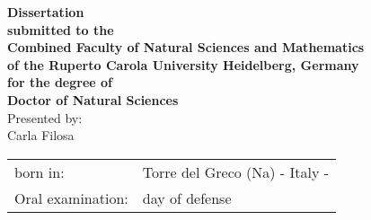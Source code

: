 \thispagestyle{plain}

\vspace*{1cm}

\begin{center}
\begin{large}
{\textbf{Dissertation\\submitted to the\\Combined Faculty of Natural Sciences and Mathematics\\of the Ruperto Carola University Heidelberg, Germany\\for the degree of\\Doctor of Natural Sciences}}\\
\vspace{10cm}
Presented by:\\ Carla Filosa\\
\vspace{1cm}
\begin{tabular}{ll}
born in: & Torre del Greco (Na) - Italy - \\
Oral examination: &  day of defense \\
\end{tabular}
\end{large}
\end{center}











\clearpage

